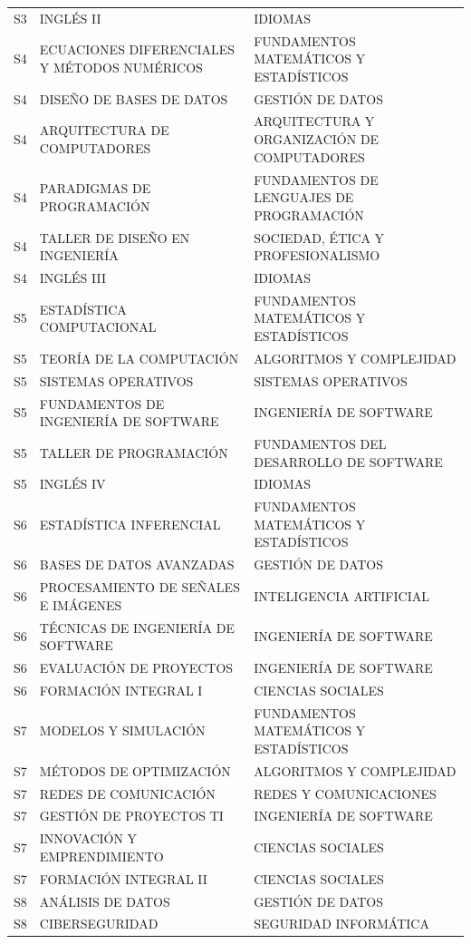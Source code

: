 \documentclass[11pt,a4paper]{article}
\begin{document}
\begin{small}
\begin{longtable}{c >{\raggedright\arraybackslash}p{8.5cm} >{\raggedright\arraybackslash}p{5.5cm}}
S3 & INGLÉS II & IDIOMAS \\
S4 & ECUACIONES DIFERENCIALES Y MÉTODOS NUMÉRICOS & FUNDAMENTOS MATEMÁTICOS Y ESTADÍSTICOS \\
S4 & DISEÑO DE BASES DE DATOS & GESTIÓN DE DATOS \\
S4 & ARQUITECTURA DE COMPUTADORES & ARQUITECTURA Y ORGANIZACIÓN DE COMPUTADORES \\
S4 & PARADIGMAS DE PROGRAMACIÓN & FUNDAMENTOS DE LENGUAJES DE PROGRAMACIÓN \\
S4 & TALLER DE DISEÑO EN INGENIERÍA & SOCIEDAD, ÉTICA Y PROFESIONALISMO \\
S4 & INGLÉS III & IDIOMAS \\
S5 & ESTADÍSTICA COMPUTACIONAL & FUNDAMENTOS MATEMÁTICOS Y ESTADÍSTICOS \\
S5 & TEORÍA DE LA COMPUTACIÓN & ALGORITMOS Y COMPLEJIDAD \\
S5 & SISTEMAS OPERATIVOS & SISTEMAS OPERATIVOS \\
S5 & FUNDAMENTOS DE INGENIERÍA DE SOFTWARE & INGENIERÍA DE SOFTWARE \\
S5 & TALLER DE PROGRAMACIÓN & FUNDAMENTOS DEL DESARROLLO DE SOFTWARE \\
S5 & INGLÉS IV & IDIOMAS \\
S6 & ESTADÍSTICA INFERENCIAL & FUNDAMENTOS MATEMÁTICOS Y ESTADÍSTICOS \\
S6 & BASES DE DATOS AVANZADAS & GESTIÓN DE DATOS \\
S6 & PROCESAMIENTO DE SEÑALES E IMÁGENES & INTELIGENCIA ARTIFICIAL \\
S6 & TÉCNICAS DE INGENIERÍA DE SOFTWARE & INGENIERÍA DE SOFTWARE \\
S6 & EVALUACIÓN DE PROYECTOS & INGENIERÍA DE SOFTWARE \\
S6 & FORMACIÓN INTEGRAL I & CIENCIAS SOCIALES \\
S7 & MODELOS Y SIMULACIÓN & FUNDAMENTOS MATEMÁTICOS Y ESTADÍSTICOS \\
S7 & MÉTODOS DE OPTIMIZACIÓN & ALGORITMOS Y COMPLEJIDAD \\
S7 & REDES DE COMUNICACIÓN & REDES Y COMUNICACIONES \\
S7 & GESTIÓN DE PROYECTOS TI & INGENIERÍA DE SOFTWARE \\
S7 & INNOVACIÓN Y EMPRENDIMIENTO & CIENCIAS SOCIALES \\
S7 & FORMACIÓN INTEGRAL II & CIENCIAS SOCIALES \\
S8 & ANÁLISIS DE DATOS & GESTIÓN DE DATOS \\
S8 & CIBERSEGURIDAD & SEGURIDAD INFORMÁTICA \\

\end{longtable}
\end{small}
\end{document}
